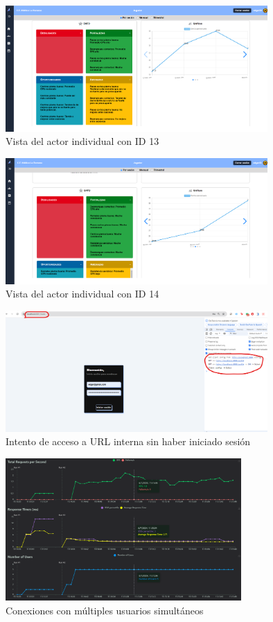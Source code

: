 \begin{figure}[H]
    \centering
    \includegraphics[width=10cm]{archivos/tfg_jorge/pruebas/player_sesion_2}
    \caption{Vista del actor individual con ID 13}\label{sistemass2}
\end{figure}

\begin{figure}[H]
    \centering
    \includegraphics[width=10cm]{archivos/tfg_jorge/pruebas/player_sesion_jugador2}
    \caption{Vista del actor individual con ID 14}\label{sistemass2}
\end{figure}

\begin{figure}[H]
    \centering
    \includegraphics[width=10cm]{archivos/tfg_jorge/pruebas/testAutenticacion}
    \caption{Intento de acceso a URL interna sin haber iniciado sesión}\label{sistemass2}
\end{figure}

\begin{figure}[H]
    \centering
    \includegraphics[width=9cm]{archivos/tfg_jorge/pruebas/testRespuesta}
    \caption{Conexiones con múltiples usuarios simultáneos}\label{sistemass2}
\end{figure}
